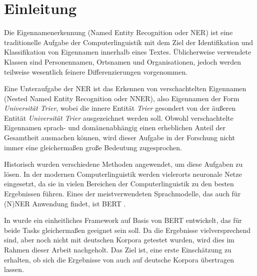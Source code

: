 

\chapter{Einleitung}
\label{ch:Einleitung}

Die Eigennamenerkennung (Named Entity Recognition oder NER) ist eine traditionelle Aufgabe der Computerlinguistik mit dem Ziel der Identifikation und Klassifikation von Eigennamen innerhalb eines Textes. Üblicherweise verwendete Klassen sind Personennamen, Ortsnamen und Organisationen, jedoch werden teilweise wesentlich feinere Differenzierungen vorgenommen.

Eine Unteraufgabe der NER ist das Erkennen von verschachtelten Eigennamen (Nested Named Entity Recognition oder NNER), also Eigennamen der Form \emph{Universität Trier}, wobei die innere Entität \emph{Trier} gesondert von der äußeren Entität \emph{Universität Trier} ausgezeichnet werden soll. Obwohl verschachtelte Eigennamen sprach- und domänenabhängig einen erheblichen Anteil der Gesamtheit ausmachen können, wird dieser Aufgabe in der Forschung nicht immer eine gleichermaßen große Bedeutung zugesprochen.

Historisch wurden verschiedene Methoden angewendet, um diese Aufgaben zu lösen. In der modernen Computerlinguistik werden vielerorts neuronale Netze eingesetzt, da sie in vielen Bereichen der Computerlinguistik zu den besten Ergebnissen führen. Eines der meistverwendeten Sprachmodelle, das auch für (N)NER Anwendung findet, ist BERT \parencite{devlin2019bert}.

In \textcite{li2019unified} wurde ein einheitliches Framework auf Basis von BERT entwickelt, das für beide Tasks gleichermaßen geeignet sein soll. Da die Ergebnisse vielversprechend sind, aber noch nicht mit deutschen Korpora getestet wurden, wird dies im Rahmen dieser Arbeit nachgeholt. Das Ziel ist, eine erste Einschätzung zu erhalten, ob sich die Ergebnisse von  auch auf deutsche Korpora übertragen lassen.

